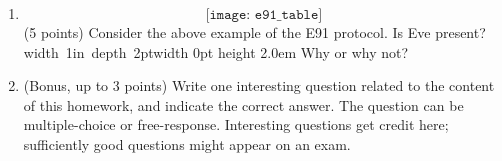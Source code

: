 \documentclass[12pt]{article}
\newcommand{\Blank}{\mbox{\hskip 4pt\vrule width 1in depth 2pt}\vrule width 0pt height 2.0em}
\begin{document}
\begin{enumerate}[font=\bfseries]
    \item \[\texttt{[image: e91\_table]}\]
    (5 points) Consider the above example of the E91 protocol. \newline
    Is Eve present? \Blank{} \newline
    Why or why not? \newpage
    \item (Bonus, up to 3 points) Write one interesting question related to the content of this homework, and indicate the correct answer. The question can be multiple-choice or free-response.  Interesting questions get credit here;  sufficiently good questions might appear on an exam.
\end{enumerate}
\end{document}
